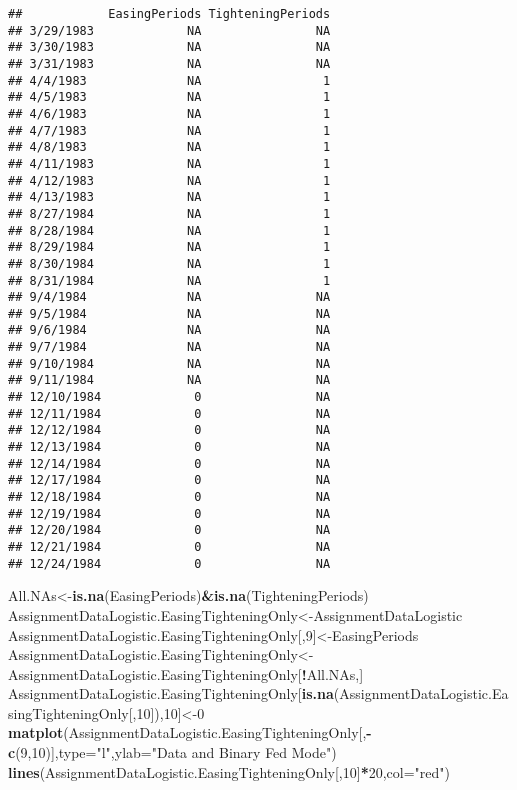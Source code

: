 \documentclass[]{article}
\newenvironment{Shaded}{\begin{snugshade}}{\end{snugshade}}
\newcommand{\KeywordTok}[1]{\textcolor[rgb]{0.13,0.29,0.53}{\textbf{#1}}}
\newcommand{\DataTypeTok}[1]{\textcolor[rgb]{0.13,0.29,0.53}{#1}}
\newcommand{\DecValTok}[1]{\textcolor[rgb]{0.00,0.00,0.81}{#1}}
\newcommand{\StringTok}[1]{\textcolor[rgb]{0.31,0.60,0.02}{#1}}
\newcommand{\OperatorTok}[1]{\textcolor[rgb]{0.81,0.36,0.00}{\textbf{#1}}}
\newcommand{\NormalTok}[1]{#1}
\begin{document}
\begin{verbatim}
##            EasingPeriods TighteningPeriods
## 3/29/1983             NA                NA
## 3/30/1983             NA                NA
## 3/31/1983             NA                NA
## 4/4/1983              NA                 1
## 4/5/1983              NA                 1
## 4/6/1983              NA                 1
## 4/7/1983              NA                 1
## 4/8/1983              NA                 1
## 4/11/1983             NA                 1
## 4/12/1983             NA                 1
## 4/13/1983             NA                 1
## 8/27/1984             NA                 1
## 8/28/1984             NA                 1
## 8/29/1984             NA                 1
## 8/30/1984             NA                 1
## 8/31/1984             NA                 1
## 9/4/1984              NA                NA
## 9/5/1984              NA                NA
## 9/6/1984              NA                NA
## 9/7/1984              NA                NA
## 9/10/1984             NA                NA
## 9/11/1984             NA                NA
## 12/10/1984             0                NA
## 12/11/1984             0                NA
## 12/12/1984             0                NA
## 12/13/1984             0                NA
## 12/14/1984             0                NA
## 12/17/1984             0                NA
## 12/18/1984             0                NA
## 12/19/1984             0                NA
## 12/20/1984             0                NA
## 12/21/1984             0                NA
## 12/24/1984             0                NA
\end{verbatim}

\begin{Shaded}
\begin{Highlighting}[]
\NormalTok{All.NAs<-}\KeywordTok{is.na}\NormalTok{(EasingPeriods)}\OperatorTok{&}\KeywordTok{is.na}\NormalTok{(TighteningPeriods)}
\NormalTok{AssignmentDataLogistic.EasingTighteningOnly<-AssignmentDataLogistic}
\NormalTok{AssignmentDataLogistic.EasingTighteningOnly[,}\DecValTok{9}\NormalTok{]<-EasingPeriods}
\NormalTok{AssignmentDataLogistic.EasingTighteningOnly<-AssignmentDataLogistic.EasingTighteningOnly[}\OperatorTok{!}\NormalTok{All.NAs,]}
\NormalTok{AssignmentDataLogistic.EasingTighteningOnly[}\KeywordTok{is.na}\NormalTok{(AssignmentDataLogistic.EasingTighteningOnly[,}\DecValTok{10}\NormalTok{]),}\DecValTok{10}\NormalTok{]<-}\DecValTok{0}
\KeywordTok{matplot}\NormalTok{(AssignmentDataLogistic.EasingTighteningOnly[,}\OperatorTok{-}\KeywordTok{c}\NormalTok{(}\DecValTok{9}\NormalTok{,}\DecValTok{10}\NormalTok{)],}\DataTypeTok{type=}\StringTok{"l"}\NormalTok{,}\DataTypeTok{ylab=}\StringTok{"Data and Binary Fed Mode"}\NormalTok{)}
\KeywordTok{lines}\NormalTok{(AssignmentDataLogistic.EasingTighteningOnly[,}\DecValTok{10}\NormalTok{]}\OperatorTok{*}\DecValTok{20}\NormalTok{,}\DataTypeTok{col=}\StringTok{"red"}\NormalTok{)}
\end{Highlighting}
\end{Shaded}
\end{document}
